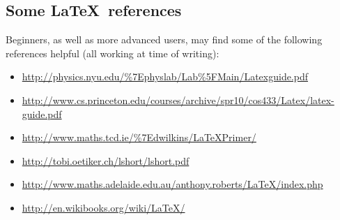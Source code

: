 
\subsection{Some \LaTeX\ references}

Beginners, as well as more advanced users, may find some of the
following references helpful (all working at time of writing):
\begin{itemize}\small


\item \url{http://physics.nyu.edu/\%7Ephyslab/Lab\%5FMain/Latexguide.pdf}
\item \url{http://www.cs.princeton.edu/courses/archive/spr10/cos433/Latex/latex-guide.pdf}
\item \url{http://www.maths.tcd.ie/\%7Edwilkins/LaTeXPrimer/}
\item \url{http://tobi.oetiker.ch/lshort/lshort.pdf}
\item \url{http://www.maths.adelaide.edu.au/anthony.roberts/LaTeX/index.php}
\item \url{http://en.wikibooks.org/wiki/LaTeX/}
\end{itemize}


\clearpage


